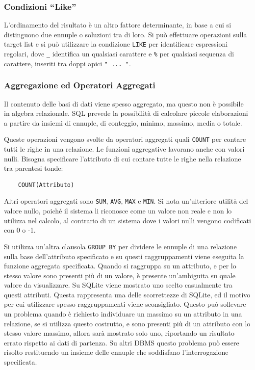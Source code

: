 \documentclass{article}
\numberwithin{equation}{subsection}
\begin{document}
\subsubsection{Condizioni ``Like''}

L'ordinamento del risultato è un altro fattore determinante, in base a cui si distinguono due ennuple 
o soluzioni tra di loro. Si può effettuare operazioni sulla target list e si può utilizzare la condizione \verb|LIKE| per identificare espressioni regolari, dove 
\verb|_| identifica un qualsiasi carattere e \verb|%| per qualsiasi sequenza di carattere, inseriti tra doppi apici \verb|" ... "|. 

\subsubsection{Aggregazione ed Operatori Aggregati}

Il contenuto delle basi di dati viene spesso aggregato, ma questo non è possibile in algebra relazionale. SQL prevede la possibilità di calcolare piccole elaborazioni 
a partire da insiemi di ennuple, di conteggio, minimo, massimo, media o totale. 

Queste operazioni vengono svolte da operatori aggregati quali \verb|COUNT| per contare tutti le righe in una relazione. Le funzioni aggregative 
lavorano anche con valori nulli. Bisogna specificare l'attributo di cui contare tutte le righe nella relazione tra parentesi tonde:
\begin{verbatim}
    COUNT(Attributo)
\end{verbatim}
Altri operatori aggregati sono \verb|SUM|, \verb|AVG|, \verb|MAX| e \verb|MIN|. Si nota un'ulteriore utilità del valore nullo, poiché il sistema li 
riconosce come un valore non reale e non lo utilizza nel calcolo, al contrario di un sistema dove i valori nulli vengono codificati con 0 o -1. 

Si utilizza un'altra clausola \verb|GROUP BY| per dividere le ennuple di una relazione sulla base dell'attributo specificato e su questi raggruppamenti viene eseguita la funzione 
aggregata specificata. Quando si raggruppa su un attributo, e per lo stesso valore sono presenti più di un valore, è presente un'ambiguita su quale valore da visualizzare. Su SQLite viene mostrato uno scelto 
casualmente tra questi attributi. Questa rappresenta una delle scorrettezze di SQLite, ed il motivo per cui utilizzare spesso raggruppamenti viene sconsigliato. Questo può sollevare un 
problema quando è richiesto individuare un massimo su un attributo in una relazione, se si utilizza questo costrutto, e sono presenti più di un attributo con lo stesso valore massimo, allora 
sarà mostrato solo uno, riportando un risultato errato rispetto ai dati di partenza. Su altri DBMS questo problema può essere risolto restituendo un insieme delle ennuple che soddisfano 
l'interrogazione specificata.  
\end{document}
